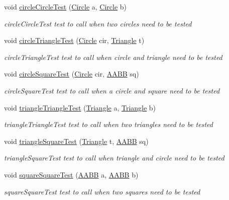 \begin{DoxyCompactItemize}
void \hyperlink{class_canvas_afefa6855ba41959bd86059c3a243b837}{circle\+Circle\+Test} (\hyperlink{class_circle}{Circle} a, \hyperlink{class_circle}{Circle} b)
\begin{DoxyCompactList}\small\item\em circle\+Circle\+Test test to call when two circles need to be tested \end{DoxyCompactList}\item 
void \hyperlink{class_canvas_a528559214b858f9f9cd0a57ca95fb630}{circle\+Triangle\+Test} (\hyperlink{class_circle}{Circle} cir, \hyperlink{class_triangle}{Triangle} t)
\begin{DoxyCompactList}\small\item\em circle\+Triangle\+Test test to call when circle and triangle need to be tested \end{DoxyCompactList}\item 
void \hyperlink{class_canvas_ad9d725683b22b2dc7a5974fed63c16bb}{circle\+Square\+Test} (\hyperlink{class_circle}{Circle} cir, \hyperlink{class_a_a_b_b}{A\+A\+BB} sq)
\begin{DoxyCompactList}\small\item\em circle\+Square\+Test test to call when a circle and square need to be tested \end{DoxyCompactList}\item 
void \hyperlink{class_canvas_a03c673b6f4e09524d322a8c00c5a49f2}{triangle\+Triangle\+Test} (\hyperlink{class_triangle}{Triangle} a, \hyperlink{class_triangle}{Triangle} b)
\begin{DoxyCompactList}\small\item\em triangle\+Triangle\+Test test to call when two triangles need to be tested \end{DoxyCompactList}\item 
void \hyperlink{class_canvas_a8b0b8a040b3e5628a2ec2a89a3025eae}{triangle\+Square\+Test} (\hyperlink{class_triangle}{Triangle} t, \hyperlink{class_a_a_b_b}{A\+A\+BB} sq)
\begin{DoxyCompactList}\small\item\em triangle\+Square\+Test test to call when triangle and circle need to be tested \end{DoxyCompactList}\item 
void \hyperlink{class_canvas_a56718ad140b37cabc6b34157903886ee}{square\+Square\+Test} (\hyperlink{class_a_a_b_b}{A\+A\+BB} a, \hyperlink{class_a_a_b_b}{A\+A\+BB} b)
\begin{DoxyCompactList}\small\item\em square\+Square\+Test test to call when two squares need to be tested \end{DoxyCompactList}\end{DoxyCompactItemize}
